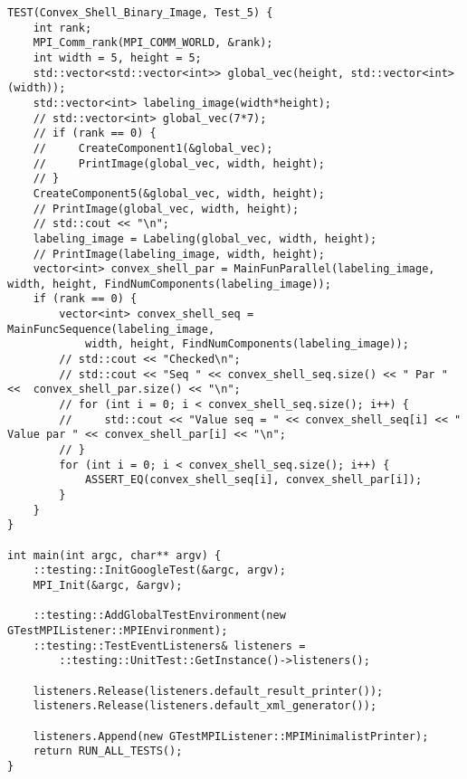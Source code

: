 \documentclass{report}
\begin{document}
\begin{lstlisting}
TEST(Convex_Shell_Binary_Image, Test_5) {
    int rank;
    MPI_Comm_rank(MPI_COMM_WORLD, &rank);
    int width = 5, height = 5;
    std::vector<std::vector<int>> global_vec(height, std::vector<int>(width));
    std::vector<int> labeling_image(width*height);
    // std::vector<int> global_vec(7*7);
    // if (rank == 0) {
    //     CreateComponent1(&global_vec);
    //     PrintImage(global_vec, width, height);
    // }
    CreateComponent5(&global_vec, width, height);
    // PrintImage(global_vec, width, height);
    // std::cout << "\n";
    labeling_image = Labeling(global_vec, width, height);
    // PrintImage(labeling_image, width, height);
    vector<int> convex_shell_par = MainFunParallel(labeling_image, width, height, FindNumComponents(labeling_image));
    if (rank == 0) {
        vector<int> convex_shell_seq = MainFuncSequence(labeling_image,
            width, height, FindNumComponents(labeling_image));
        // std::cout << "Checked\n";
        // std::cout << "Seq " << convex_shell_seq.size() << " Par " <<  convex_shell_par.size() << "\n";
        // for (int i = 0; i < convex_shell_seq.size(); i++) {
        //     std::cout << "Value seq = " << convex_shell_seq[i] << " Value par " << convex_shell_par[i] << "\n";
        // }
        for (int i = 0; i < convex_shell_seq.size(); i++) {
            ASSERT_EQ(convex_shell_seq[i], convex_shell_par[i]);
        }
    }
}

int main(int argc, char** argv) {
    ::testing::InitGoogleTest(&argc, argv);
    MPI_Init(&argc, &argv);

    ::testing::AddGlobalTestEnvironment(new GTestMPIListener::MPIEnvironment);
    ::testing::TestEventListeners& listeners =
        ::testing::UnitTest::GetInstance()->listeners();

    listeners.Release(listeners.default_result_printer());
    listeners.Release(listeners.default_xml_generator());

    listeners.Append(new GTestMPIListener::MPIMinimalistPrinter);
    return RUN_ALL_TESTS();
}


\end{lstlisting}
\end{document}
